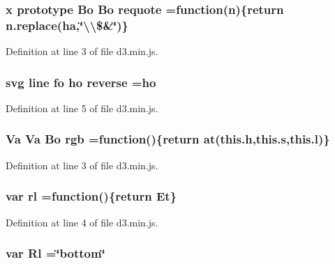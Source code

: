 \subsubsection[{requote}]{ {\bf x} {\bf prototype} {\bf Bo} {\bf Bo} requote =function({\bf n})\{{\bf return} n.\+replace({\bf ha},\char`\"{}\textbackslash{}\textbackslash{}\$\&\char`\"{})\}}\label{d3_8min_8js_a97d391b981d0612b711a051b91991976}


Definition at line 3 of file d3.\+min.\+js.

\subsubsection[{reverse}]{ {\bf svg} {\bf line} {\bf fo} {\bf ho} reverse ={\bf ho}}\label{d3_8min_8js_a75b10c66749fc754fd03b6c11e4d828a}


Definition at line 5 of file d3.\+min.\+js.

\subsubsection[{rgb}]{ {\bf Va} {\bf Va} {\bf Bo} rgb =function()\{{\bf return} {\bf at}(this.\+h,this.\+s,this.\+l)\}}\label{d3_8min_8js_a0f7b16144b0464f1dea5592790e4a65b}


Definition at line 3 of file d3.\+min.\+js.

\subsubsection[{rl}]{\setlength{\rightskip}{0pt plus 5cm}var rl =function()\{{\bf return} Et\}}\label{d3_8min_8js_afcbbda81fce2e8b7c995a7bf22f7090c}


Definition at line 4 of file d3.\+min.\+js.

\subsubsection[{Rl}]{\setlength{\rightskip}{0pt plus 5cm}var Rl =\char`\"{}bottom\char`\"{}}\label{d3_8min_8js_a86909552eee9366c491c80890f56419f}


